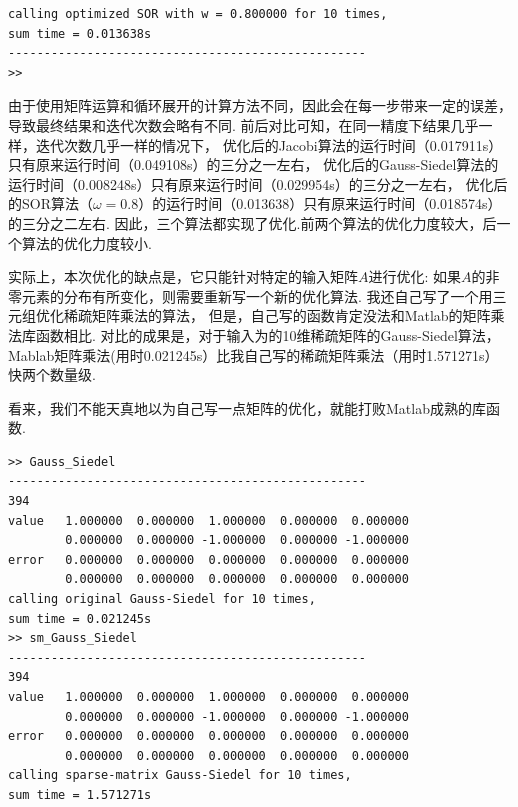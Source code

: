 \documentclass[12pt,a4paper,utf8]{ctexart}
\begin{document}
\begin{enumerate}
\begin{itemize}
\begin{lstlisting}
calling optimized SOR with w = 0.800000 for 10 times,
sum time = 0.013638s
--------------------------------------------------
>>  
\end{lstlisting}
    \par
    由于使用矩阵运算和循环展开的计算方法不同，因此会在每一步带来一定的误差，导致最终结果和迭代次数会略有不同.
    前后对比可知，在同一精度下结果几乎一样，迭代次数几乎一样的情况下，
    优化后的Jacobi算法的运行时间（0.017911s）只有原来运行时间（0.049108s）的三分之一左右，
    优化后的Gauss-Siedel算法的运行时间（0.008248s）只有原来运行时间（0.029954s）的三分之一左右，
    优化后的SOR算法（$\omega = 0.8$）的运行时间（0.013638）只有原来运行时间（0.018574s）的三分之二左右.
    因此，三个算法都实现了优化.前两个算法的优化力度较大，后一个算法的优化力度较小.
    \par
    实际上，本次优化的缺点是，它只能针对特定的输入矩阵$A$进行优化:
    如果$A$的非零元素的分布有所变化，则需要重新写一个新的优化算法.
    我还自己写了一个用三元组优化稀疏矩阵乘法的算法，
    但是，自己写的函数肯定没法和Matlab的矩阵乘法库函数相比.
    对比的成果是，对于输入为的10维稀疏矩阵的Gauss-Siedel算法，
    Mablab矩阵乘法(用时0.021245s）比我自己写的稀疏矩阵乘法（用时1.571271s）快两个数量级.
    \par
    看来，我们不能天真地以为自己写一点矩阵的优化，就能打败Matlab成熟的库函数.
\begin{lstlisting}
>> Gauss_Siedel
--------------------------------------------------
394     
value   1.000000  0.000000  1.000000  0.000000  0.000000       
        0.000000  0.000000 -1.000000  0.000000 -1.000000
error   0.000000  0.000000  0.000000  0.000000  0.000000  
        0.000000  0.000000  0.000000  0.000000  0.000000
calling original Gauss-Siedel for 10 times, 
sum time = 0.021245s
>> sm_Gauss_Siedel
--------------------------------------------------
394     
value   1.000000  0.000000  1.000000  0.000000  0.000000  
        0.000000  0.000000 -1.000000  0.000000 -1.000000
error   0.000000  0.000000  0.000000  0.000000  0.000000  
        0.000000  0.000000  0.000000  0.000000  0.000000
calling sparse-matrix Gauss-Siedel for 10 times, 
sum time = 1.571271s
\end{lstlisting}
    \end{itemize}


\end{enumerate}
\end{document}

